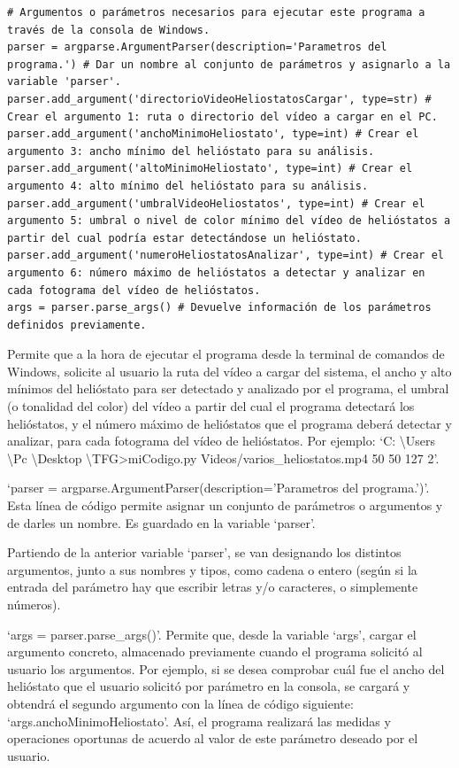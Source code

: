 \begin{lstlisting}
# Argumentos o parámetros necesarios para ejecutar este programa a través de la consola de Windows.
parser = argparse.ArgumentParser(description='Parametros del programa.') # Dar un nombre al conjunto de parámetros y asignarlo a la variable 'parser'.
parser.add_argument('directorioVideoHeliostatosCargar', type=str) # Crear el argumento 1: ruta o directorio del vídeo a cargar en el PC.
parser.add_argument('anchoMinimoHeliostato', type=int) # Crear el argumento 3: ancho mínimo del helióstato para su análisis.
parser.add_argument('altoMinimoHeliostato', type=int) # Crear el argumento 4: alto mínimo del helióstato para su análisis.
parser.add_argument('umbralVideoHeliostatos', type=int) # Crear el argumento 5: umbral o nivel de color mínimo del vídeo de helióstatos a partir del cual podría estar detectándose un helióstato.
parser.add_argument('numeroHeliostatosAnalizar', type=int) # Crear el argumento 6: número máximo de helióstatos a detectar y analizar en cada fotograma del vídeo de helióstatos.
args = parser.parse_args() # Devuelve información de los parámetros definidos previamente.
\end{lstlisting}

Permite que a la hora de ejecutar el programa desde la terminal de comandos de Windows, solicite al usuario la ruta del vídeo a cargar del sistema, el ancho y alto mínimos del helióstato para ser detectado y analizado por el programa, el umbral (o tonalidad del color) del vídeo a partir del cual el programa detectará los helióstatos, y el número máximo de helióstatos que el programa deberá detectar y analizar, para cada fotograma del vídeo de helióstatos. Por ejemplo: ‘C: \textbackslash Users \textbackslash Pc \textbackslash Desktop \textbackslash TFG>miCodigo.py Videos/varios\_heliostatos.mp4 50 50 127 2’.

‘parser = argparse.ArgumentParser(description='Parametros del programa.')’. Esta línea de código permite asignar un conjunto de parámetros o argumentos y de darles un nombre. Es guardado en la variable ‘parser’.

Partiendo de la anterior variable ‘parser’, se van designando los distintos argumentos, junto a sus nombres y tipos, como cadena o entero (según si la entrada del parámetro hay que escribir letras y/o caracteres, o simplemente números).

‘args = parser.parse\_args()’. Permite que, desde la variable ‘args’, cargar el argumento concreto, almacenado previamente cuando el programa solicitó al usuario los argumentos. Por ejemplo, si se desea comprobar cuál fue el ancho del helióstato que el usuario solicitó por parámetro en la consola, se cargará y obtendrá el segundo argumento con la línea de código siguiente: ‘args.anchoMinimoHeliostato’. Así, el programa realizará las medidas y operaciones oportunas de acuerdo al valor de este parámetro deseado por el usuario.\\[20pt]

